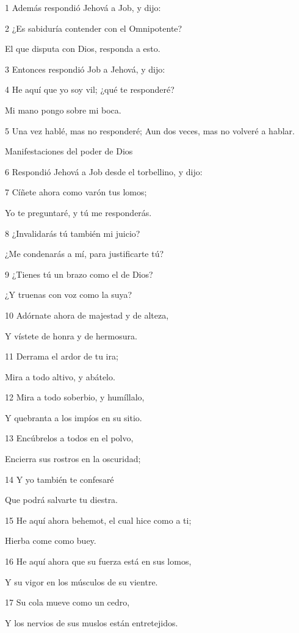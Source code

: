 \par 1 Además respondió Jehová a Job, y dijo:
\par 2 ¿Es sabiduría contender con el Omnipotente? 
\par El que disputa con Dios, responda a esto.
\par 3 Entonces respondió Job a Jehová, y dijo:
\par 4 He aquí que yo soy vil; ¿qué te responderé? 
\par Mi mano pongo sobre mi boca. 
\par 5 Una vez hablé, mas no responderé; Aun dos veces, mas no volveré a hablar.
\par Manifestaciones del poder de Dios 
\par 6 Respondió Jehová a Job desde el torbellino, y dijo:
\par 7 Cíñete ahora como varón tus lomos;
\par Yo te preguntaré, y tú me responderás.
\par 8 ¿Invalidarás tú también mi juicio?
\par ¿Me condenarás a mí, para justificarte tú?
\par 9 ¿Tienes tú un brazo como el de Dios?
\par ¿Y truenas con voz como la suya?
\par 10 Adórnate ahora de majestad y de alteza,
\par Y vístete de honra y de hermosura.
\par 11 Derrama el ardor de tu ira;
\par Mira a todo altivo, y abátelo.
\par 12 Mira a todo soberbio, y humíllalo,
\par Y quebranta a los impíos en su sitio.
\par 13 Encúbrelos a todos en el polvo,
\par Encierra sus rostros en la oscuridad;
\par 14 Y yo también te confesaré
\par Que podrá salvarte tu diestra.
\par 15 He aquí ahora behemot, el cual hice como a ti;
\par Hierba come como buey.
\par 16 He aquí ahora que su fuerza está en sus lomos,
\par Y su vigor en los músculos de su vientre.
\par 17 Su cola mueve como un cedro,
\par Y los nervios de sus muslos están entretejidos.
